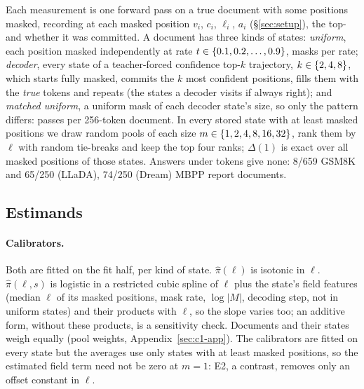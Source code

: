 Each measurement is one forward pass on a true document with some positions masked, recording
at each masked position $v_i$, $c_i$, $\ell_i$, $a_i$ (\S\ref{sec:setup}), the top-\VivaTopK{} and
whether it was committed. A document
has three kinds of states: \emph{uniform}, each position masked independently at rate
$t\in\{0.1,0.2,\dots,0.9\}$, \VivaMasksPerRate{} masks per rate; \emph{decoder}, every state of a teacher-forced confidence top-$k$ trajectory,
$k\in\{2, 4, 8\}$, which starts fully masked, commits the $k$ most confident positions,
fills them with the \emph{true} tokens and repeats (the states a decoder visits if always
right); and \emph{matched uniform}, a uniform mask of each decoder state's size, so
only the pattern differs: \VivaPassesPerDoc{} passes per 256-token document. In every stored state with at
least \VivaPoolMax{} masked positions we draw \VivaNPools{}
random pools of each size $m\in\{1, 2, 4, 8, 16, 32\}$, rank them by $\ell$ with random tie-breaks
and keep the top four ranks; $\Delta(1)$ is exact over all masked
positions of those states. Answers under \VivaPoolMax{} tokens give none: 8/659 GSM8K and
65/250 (LLaDA), 74/250 (Dream) MBPP report documents.

\subsection{Estimands}
\label{sec:estimands}

\paragraph{Calibrators.}
Both are fitted on the fit half, per kind of state. $\hat\pi(\ell)$ is isotonic in $\ell$. $\hat\pi(\ell,s)$ is
logistic in a restricted cubic spline of $\ell$ plus the state's field features (median $\ell$
of its masked positions, mask rate, $\log|M|$, decoding step, not in uniform states) and their products with $\ell$, so
the slope varies too; an additive form, without these products, is a sensitivity check.
Documents and their states weigh equally (pool weights, Appendix~\ref{sec:c1-app}). The
calibrators are fitted on every state but the averages use only states with at
least \VivaPoolMax{} masked positions, so the estimated field term need not be zero at $m=1$:
E2, a contrast, removes only an offset constant in $\ell$.


